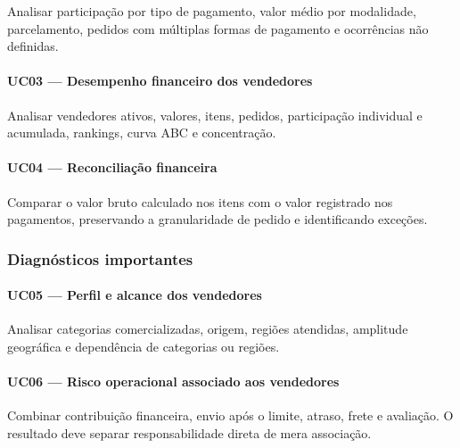 \documentclass[12pt,a4paper]{article}
\begin{document}
Analisar participação por tipo de pagamento, valor médio por modalidade,
parcelamento, pedidos com múltiplas formas de pagamento e ocorrências
não definidas.

\paragraph{UC03 --- Desempenho financeiro dos
vendedores}\label{docs__analytics__contrato_analitico.md__uc03-desempenho-financeiro-dos-vendedores}

Analisar vendedores ativos, valores, itens, pedidos, participação
individual e acumulada, rankings, curva ABC e concentração.

\paragraph{UC04 --- Reconciliação
financeira}\label{docs__analytics__contrato_analitico.md__uc04-reconciliauxe7uxe3o-financeira}

Comparar o valor bruto calculado nos itens com o valor registrado nos
pagamentos, preservando a granularidade de pedido e identificando
exceções.

\subsubsection{Diagnósticos
importantes}\label{docs__analytics__contrato_analitico.md__diagnuxf3sticos-importantes}

\paragraph{UC05 --- Perfil e alcance dos
vendedores}\label{docs__analytics__contrato_analitico.md__uc05-perfil-e-alcance-dos-vendedores}

Analisar categorias comercializadas, origem, regiões atendidas,
amplitude geográfica e dependência de categorias ou regiões.

\paragraph{UC06 --- Risco operacional associado aos
vendedores}\label{docs__analytics__contrato_analitico.md__uc06-risco-operacional-associado-aos-vendedores}

Combinar contribuição financeira, envio após o limite, atraso, frete e
avaliação. O resultado deve separar responsabilidade direta de mera
associação.
\end{document}
